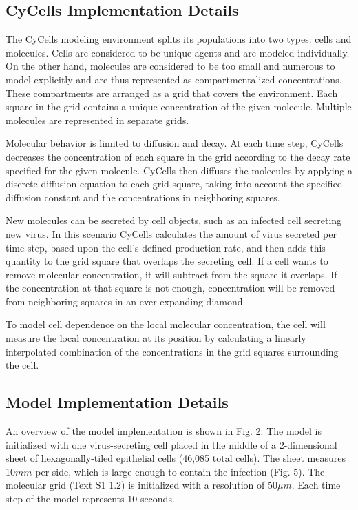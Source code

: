 \documentclass[10pt]{article}
\begin{document}
\subsection{CyCells Implementation Details}

The CyCells modeling environment splits its populations into two types: cells and molecules.  Cells are considered to be unique agents and are modeled individually.  On the other hand, molecules are considered to be too small and numerous to model explicitly and are thus represented as compartmentalized concentrations.  These compartments are arranged as a grid that covers the environment.  Each square in the grid contains a unique concentration of the given molecule.  Multiple molecules are represented in separate grids.

Molecular behavior is limited to diffusion and decay.  At each time step, CyCells decreases the concentration of each square in the grid according to the decay rate specified for the given molecule.  CyCells then diffuses the molecules by applying a discrete diffusion equation to each grid square, taking into account the specified diffusion constant and the concentrations in neighboring squares.

New molecules can be secreted by cell objects, such as an infected cell secreting new virus.  In this scenario CyCells calculates the amount of virus secreted per time step, based upon the cell's defined production rate, and then adds this quantity to the grid square that overlaps the secreting cell.  If a cell wants to remove molecular concentration, it will subtract from the square it overlaps.  If the concentration at that square is not enough, concentration will be removed from neighboring squares in an ever expanding diamond.

To model cell dependence on the local molecular concentration, the cell will measure the local concentration at its position by calculating a linearly interpolated combination of the concentrations in the grid squares surrounding the cell.


\subsection{Model Implementation Details}

An overview of the model implementation is shown in Fig. 2.  The model is initialized with one virus-secreting cell placed in the middle of a 2-dimensional sheet of hexagonally-tiled epithelial cells (46,085 total cells).  The sheet measures 10$mm$ per side, which is large enough to contain the infection (Fig. 5).  The molecular grid (Text S1 1.2) is initialized with a resolution of 50$\mu m$.  Each time step of the model represents 10 seconds.
\end{document}
